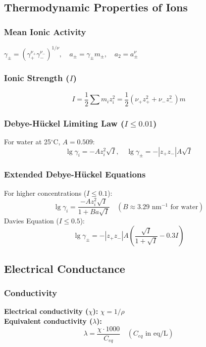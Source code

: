 \subsection{Thermodynamic Properties of Ions}

\subsubsection{Mean Ionic Activity}
$\gamma_{\pm} = (\gamma_+^{\nu_+} \gamma_-^{\nu_-})^{1/\nu}, \quad a_{\pm} = \gamma_{\pm} m_{\pm}, \quad a_2 = a_{\pm}^\nu$

\subsubsection{Ionic Strength ($I$)}
\begin{equation}
    I = \frac{1}{2} \sum m_i z_i^2 = \frac{1}{2} (\nu_+ z_+^2 + \nu_- z_-^2) m
\end{equation}

\subsubsection{Debye-Hückel Limiting Law ($I \leq 0.01$)}
For water at 25$^{\circ}$C, $A = 0.509$:
\begin{equation}
    \lg \gamma_i = -A z_i^2 \sqrt{I}, \quad \lg \gamma_{\pm} = -|z_+ z_-| A \sqrt{I}
\end{equation}

\subsubsection{Extended Debye-Hückel Equations}
For higher concentrations ($I \leq 0.1$):
\begin{equation}
    \lg \gamma_i = \frac{-A z_i^2 \sqrt{I}}{1 + B a \sqrt{I}} \quad (B \approx 3.29 \text{ nm}^{-1} \text{ for water})
\end{equation}
Davies Equation ($I \leq 0.5$):
\begin{equation}
    \lg \gamma_{\pm} = -|z_+ z_-| A \left( \frac{\sqrt{I}}{1+\sqrt{I}} - 0.3 I \right)
\end{equation}

\subsection{Electrical Conductance}

\subsubsection{Conductivity}
\textbf{Electrical conductivity ($\chi$):} $\chi = 1/\rho$ \\
\textbf{Equivalent conductivity ($\lambda$):}
\begin{equation}
    \lambda = \frac{\chi \cdot 1000}{C_{eq}} \quad (C_{eq} \text{ in eq/L})
\end{equation}

